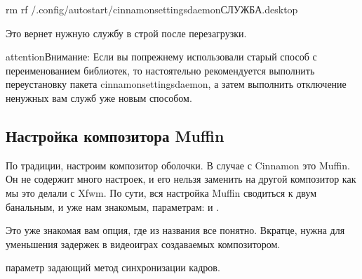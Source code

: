 \documentclass[letterpaper,10pt,russian,openany]{sphinxmanual}
\begin{document}
\begin{sphinxVerbatim}[commandchars=\\\{\}]
rm \PYGZhy{}rf \PYGZti{}/.config/autostart/cinnamon\PYGZhy{}settings\PYGZhy{}daemon\PYGZhy{}СЛУЖБА.desktop
\end{sphinxVerbatim}

\sphinxAtStartPar
Это вернет нужную службу в строй после перезагрузки.

\begin{sphinxadmonition}{attention}{Внимание:}
\sphinxAtStartPar
Если вы по\sphinxhyphen{}прежнему использовали старый способ с переименованием библиотек,
то настоятельно рекомендуется выполнить переустановку пакета cinnamon\sphinxhyphen{}settings\sphinxhyphen{}daemon, а
затем выполнить отключение ненужных вам служб уже новым способом.
\end{sphinxadmonition}

\ignorespaces 

\subsection{Настройка композитора Muffin}
\label{\detokenize{source/de-optimizations:muffin}}\label{\detokenize{source/de-optimizations:lowlatency-muffin}}\label{\detokenize{source/de-optimizations:index-24}}
\sphinxAtStartPar
По традиции, настроим композитор оболочки. В случае с Cinnamon это Muffin.
Он не содержит много настроек, и его нельзя заменить на другой композитор как мы это делали с Xfwm.
По сути, вся настройка Muffin сводиться к двум банальным, и уже нам знакомым, параметрам:
 и .

\noindent{}

\sphinxAtStartPar
{} \sphinxhyphen{} Это уже знакомая вам опция, где из названия все понятно.
Вкратце, нужна для уменьшения задержек в видеоиграх создаваемых композитором.

\sphinxAtStartPar
{} \sphinxhyphen{} параметр задающий метод синхронизации кадров.
\end{document}
